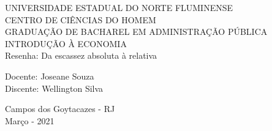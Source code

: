 \begin{center}
    {\large UNIVERSIDADE ESTADUAL DO NORTE FLUMINENSE}
    \\[0.2cm]
    {\large CENTRO DE CIÊNCIAS DO HOMEM}
    \\[0.2cm]
    {\large GRADUAÇÃO DE BACHAREL EM ADMINISTRAÇÃO PÚBLICA}
    \\[0.2cm]
    {\large INTRODUÇÃO À ECONOMIA}
    \\[8cm]
    { \huge Resenha: Da escassez absoluta à relativa}
    \\[4cm]
\end{center}

\begin{flushleft}
    Docente: Joseane Souza\\[.2cm]
    Discente: Wellington Silva\\[4cm]
\end{flushleft}

\begin{center}
    {\large Campos dos Goytacazes - RJ}\\[0.2cm]
    {\large Março - 2021}
\end{center}
